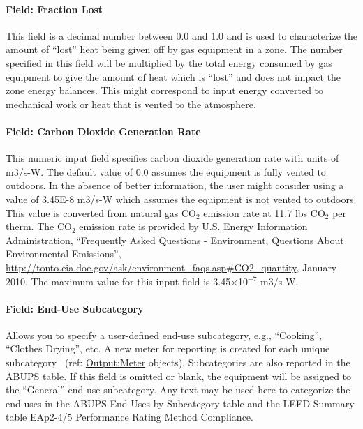 \paragraph{Field: Fraction Lost}\label{field-fraction-lost-1}

This field is a decimal number between 0.0 and 1.0 and is used to characterize the amount of ``lost'' heat being given off by gas equipment in a zone. The number specified in this field will be multiplied by the total energy consumed by gas equipment to give the amount of heat which is ``lost'' and does not impact the zone energy balances. This might correspond to input energy converted to mechanical work or heat that is vented to the atmosphere.

\paragraph{Field: Carbon Dioxide Generation Rate}\label{field-carbon-dioxide-generation-rate-1}

This numeric input field specifies carbon dioxide generation rate with units of m3/s-W. The default value of 0.0 assumes the equipment is fully vented to outdoors. In the absence of better information, the user might consider using a value of 3.45E-8 m3/s-W which assumes the equipment is not vented to outdoors. This value is converted from natural gas CO\(_{2}\) emission rate at 11.7 lbs CO\(_{2}\) per therm. The CO\(_{2}\) emission rate is provided by U.S. Energy Information Administration, ``Frequently Asked Questions - Environment, Questions About Environmental Emissions'', \url{http://tonto.eia.doe.gov/ask/environment_faqs.asp#CO2_quantity}, January 2010. The maximum value for this input field is 3.45$\times$10$^{-7}$ m3/s-W.

\paragraph{Field: End-Use Subcategory}\label{field-end-use-subcategory-2-001}

Allows you to specify a user-defined end-use subcategory, e.g., ``Cooking'', ``Clothes Drying'', etc. A new meter for reporting is created for each unique subcategory~ (ref: \hyperref[outputmeter-and-outputmetermeterfileonly]{Output:Meter} objects). Subcategories are also reported in the ABUPS table. If this field is omitted or blank, the equipment will be assigned to the ``General'' end-use subcategory. Any text may be used here to categorize the end-uses in the ABUPS End Uses by Subcategory table and the LEED Summary table EAp2-4/5 Performance Rating Method Compliance.

